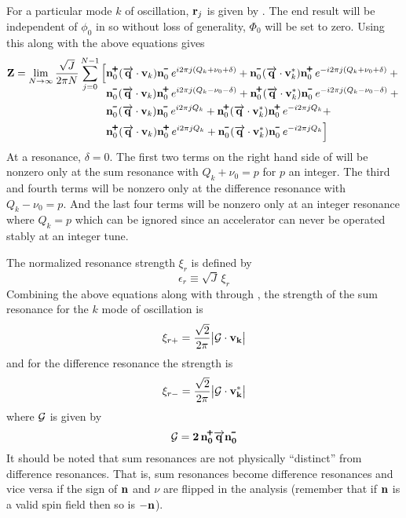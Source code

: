 For a particular mode $k$ of oscillation, ${\bf r}_j$ is given by . The end result will be
independent of $\phi_0$ in  so without loss of generality, $\Phi_0$ will be set to zero.
Using this along with the above equations gives
\begin{align}
  \bfZ = \lim_{N \rightarrow \infty} 
    \frac{\sqrt{J}}{2 \pi N} 
    \sum_{j = 0}^{N-1} \Big[
    &\bfn_0^\ppls (\arrowbfq \cdot \bfv_k)   \bfn_0^\mmin \, e^{ i2\pi j (Q_k + \nu_0 + \delta)} + 
     \bfn_0^\mmin (\arrowbfq \cdot \bfv_k^*) \bfn_0^\ppls \, e^{-i2\pi j (Q_k + \nu_0 + \delta)} + {} 
    \nonumber \\[-2ex]
    &\bfn_0^\mmin (\arrowbfq \cdot \bfv_k)   \bfn_0^\ppls \, e^{ i2\pi j (Q_k - \nu_0 - \delta)} +
     \bfn_0^\ppls (\arrowbfq \cdot \bfv_k^*) \bfn_0^\mmin \, e^{-i2\pi j (Q_k - \nu_0 - \delta)} + {}
    \label{zj2pn} \\
    &\bfn_0^\mmin (\arrowbfq \cdot \bfv_k)   \bfn_0^\mmin \, e^{i2\pi j Q_k} + 
     \bfn_0^\ppls (\arrowbfq \cdot \bfv_k^*) \bfn_0^\ppls \, e^{-i2\pi j Q_k} + \CRNO
    &\bfn_0^\ppls (\arrowbfq \cdot \bfv_k)   \bfn_0^\ppls \, e^{i2\pi j Q_k} + 
     \bfn_0^\mmin (\arrowbfq \cdot \bfv_k^*) \bfn_0^\mmin \, e^{-i2\pi j Q_k}
   \Big] \nonumber
\end{align}
At a resonance, $\delta = 0$. 
The first two terms on the right hand side of  will be nonzero only at the sum resonance
with $Q_k + \nu_0 = p$ for $p$ an integer.  The third and fourth terms will be nonzero only at the
difference resonance with $Q_k - \nu_0 = p$.  And the last four terms will be nonzero only at an
integer resonance where $Q_k = p$ which can be ignored since an accelerator can never be operated
stably at an integer tune.

The normalized resonance strength $\xi_r$ is defined by
\begin{equation}
  \epsilon_r \equiv \sqrt{J} \, \xi_r
  \label{ejx}
\end{equation}
Combining the above equations along with  through , the strength of the sum
resonance for the $k$ mode of oscillation is
\begin{equation}
  \xi_{r+} = \frac{\sqrt{2}}{2\pi} \big| \bf{\cal G} \cdot {\bf v}_k \big| 
  \label{x12pq1}
\end{equation}
and for the difference resonance the strength is
\begin{equation}
  \xi_{r-} = \frac{\sqrt{2}}{2\pi} \big|
  \bf{\cal G} \cdot {\bf v}_k^* \big| 
  \label{x12pq2}
\end{equation}
where $\bf{\cal G}$ is given by
\begin{equation}
  \bf{\cal G} = 2 \, \bfn_0^\ppls \arrowbfq \bfn_0^\mmin
  \label{g2nqn}
\end{equation}
It should be noted that sum resonances are not physically ``distinct'' from difference
resonances. That is, sum resonances become difference resonances and vice versa if the sign of
${\bf n}$ and $\nu$ are flipped in the analysis (remember that if ${\bf n}$ is a valid spin field then so
is $-{\bf n}$).


